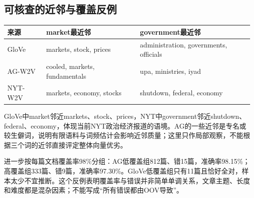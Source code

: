 \documentclass[UTF8,a4paper,11pt,fontset=fandol]{ctexart}
\begin{document}
\subsection{可核查的近邻与覆盖反例}
\begin{center}\begin{minipage}{\linewidth}\small
\setlength{\tabcolsep}{4pt}
\renewcommand{\arraystretch}{1.22}
\begin{tabular}{>{\raggedright\arraybackslash}p{}>{\raggedright\arraybackslash}p{}>{\raggedright\arraybackslash}p{}}
\toprule
\textbf{来源} & \textbf{market最近邻} & \textbf{government最近邻} \\
\midrule
GloVe & markets, stock, prices & administration, governments, officials \\
AG-W2V & cooled, markets, fundamentals & upa, ministries, iyad \\
NYT-W2V & markets, economy, stocks & shutdown, federal, economy \\
\bottomrule
\end{tabular}
\end{minipage}\end{center}
GloVe中market邻近markets、stock、prices，NYT中government邻近shutdown、federal、economy，体现当前NYT政治经济报道的语境。AG的一些近邻是专名或较生僻词，说明有限语料与词频估计会影响近邻质量；这里只作局部观察，不能根据三个词的近邻直接评定整体向量优劣。

进一步按每篇文档覆盖率98\%分组：AG低覆盖组812篇、错15篇，准确率98.15\%；高覆盖组333篇、错9篇，准确率97.30\%。GloVe低覆盖组只有11篇且恰好全对，样本太少不宜推断。这个反例表明覆盖率与错误并非简单单调关系，文章主题、长度和难度都是混杂因素；不能写成“所有错误都由OOV导致”。
\end{document}
